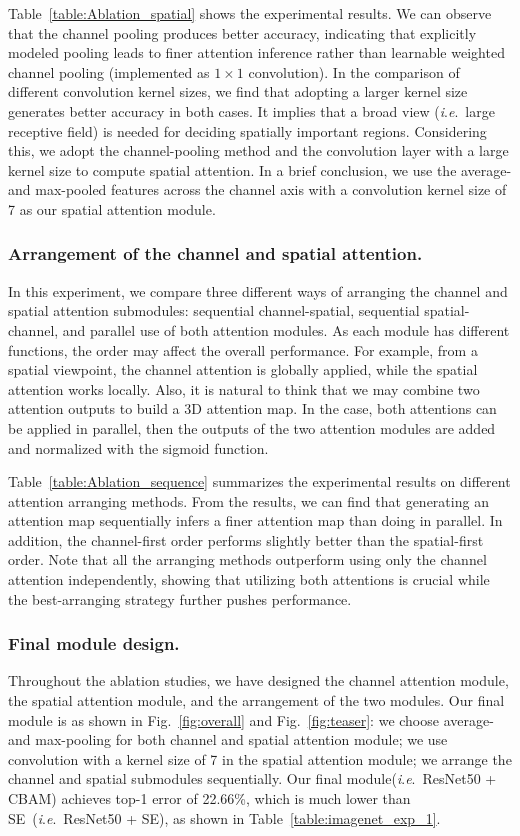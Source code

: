\documentclass[runningheads]{llncs}
\newcommand{\ie}{\textit{i}.\textit{e}.}
\newcommand{\figref}[1]{Fig.~\ref{#1}}
\newcommand{\tabref}[1]{Table~\ref{#1}}
\begin{document}
\tabref{table:Ablation_spatial} shows the experimental results. We can observe that the channel pooling produces better accuracy, indicating that explicitly modeled pooling leads to finer attention inference rather than learnable weighted channel pooling (implemented as \(1\times 1\) convolution). In the comparison of different convolution kernel sizes, we find that adopting a larger kernel size generates better accuracy in both cases. It implies that a broad view (\ie\ large receptive field) is needed for deciding spatially important regions. Considering this, we adopt the channel-pooling method and the convolution layer with a large kernel size to compute spatial attention. In a brief conclusion, we use the average- and max-pooled features across the channel axis with a convolution kernel size of 7 as our spatial attention module.

\subsubsection{Arrangement of the channel and spatial attention.}
In this experiment, we compare three different ways of arranging the channel and spatial attention submodules: sequential channel-spatial, sequential spatial-channel, and parallel use of both attention modules. As each module has different functions, the order may affect the overall performance. For example, from a spatial viewpoint, the channel attention is globally applied, while the spatial attention works locally. Also, it is natural to think that we may combine two attention outputs to build a 3D attention map. In the case, both attentions can be applied in parallel, then the outputs of the two attention modules are added and normalized with the sigmoid function.

\tabref{table:Ablation_sequence} summarizes the experimental results on different attention arranging methods. From the results, we can find that generating an attention map sequentially infers a finer attention map than doing in parallel. In addition, the channel-first order performs slightly better than the spatial-first order. Note that all the arranging methods outperform using only the channel attention independently, showing that utilizing both attentions is crucial while the best-arranging strategy further pushes performance.

\subsubsection{Final module design.}
Throughout the ablation studies, we have designed the channel attention module, the spatial attention module, and the arrangement of the two modules. Our final module is as shown in \figref{fig:overall} and \figref{fig:teaser}: we choose average- and max-pooling for both channel and spatial attention module; we use convolution with a kernel size of 7 in the spatial attention module; we arrange the channel and spatial submodules sequentially. Our final module(\ie\ ResNet50 + CBAM) achieves top-1 error of 22.66\%, which is much lower than SE~\cite{hu2017squeeze}(\ie\ ResNet50 + SE), as shown in \tabref{table:imagenet_exp_1}.
\end{document}
